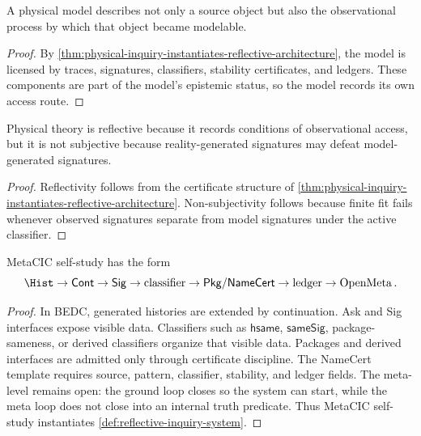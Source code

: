 \begin{corollary}
\label{cor:physical-modelling-self-descriptive}
A physical model describes not only a source object but also the observational process by which that object became modelable.
\end{corollary}

\begin{proof}
By \autoref{thm:physical-inquiry-instantiates-reflective-architecture}, the model is licensed by traces, signatures, classifiers, stability certificates, and ledgers. These components are part of the model's epistemic status, so the model records its own access route.
\end{proof}

\begin{corollary}
\label{cor:physical-theory-reflective-not-subjective}
Physical theory is reflective because it records conditions of observational access, but it is not subjective because reality-generated signatures may defeat model-generated signatures.
\end{corollary}

\begin{proof}
Reflectivity follows from the certificate structure of \autoref{thm:physical-inquiry-instantiates-reflective-architecture}. Non-subjectivity follows because finite fit fails whenever observed signatures separate from model signatures under the active classifier.
\end{proof}

\begin{theorem}
\label{thm:metacic-self-study-instantiates-reflective-architecture}
MetaCIC self-study has the form
$$
\Hist
\to
\mathsf{Cont}
\to
\mathsf{Sig}
\to
\text{classifier}
\to
\mathsf{Pkg}/\mathsf{NameCert}
\to
\text{ledger}
\to
\operatorname{OpenMeta}.
$$
\end{theorem}

\begin{proof}
In BEDC, generated histories are extended by continuation. Ask and Sig interfaces expose visible data. Classifiers such as $\mathsf{hsame}$, $\mathsf{sameSig}$, package-sameness, or derived classifiers organize that visible data. Packages and derived interfaces are admitted only through certificate discipline. The NameCert template requires source, pattern, classifier, stability, and ledger fields. The meta-level remains open: the ground loop closes so the system can start, while the meta loop does not close into an internal truth predicate. Thus MetaCIC self-study instantiates \autoref{def:reflective-inquiry-system}.
\end{proof}

